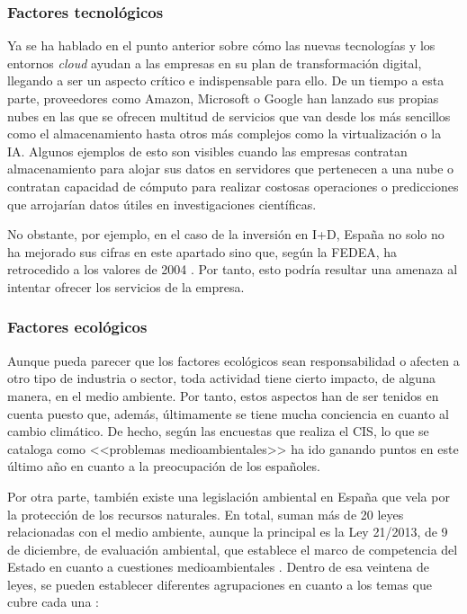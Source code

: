 \subsubsection{Factores tecnológicos}
Ya se ha hablado en el punto anterior sobre cómo las nuevas tecnologías y los entornos \textit{cloud} ayudan a las empresas en su plan de transformación digital, llegando a ser un aspecto crítico e indispensable para ello. De un tiempo a esta parte, proveedores como Amazon, Microsoft o Google han lanzado sus propias nubes en las que se ofrecen multitud de servicios que van desde los más sencillos como el almacenamiento hasta otros más complejos como la virtualización o la \acf{IA}. Algunos ejemplos de esto son visibles cuando las empresas contratan almacenamiento para alojar sus datos en servidores que pertenecen a una nube o contratan capacidad de cómputo para realizar costosas operaciones o predicciones que arrojarían datos útiles en investigaciones científicas.

No obstante, por ejemplo, en el caso de la inversión en I+D, España no solo no ha mejorado sus cifras en este apartado sino que, según la \acf{FEDEA}, ha retrocedido a los valores de 2004 \cite{robertolopezvargas2019}. Por tanto, esto podría resultar una amenaza al intentar ofrecer los servicios de la empresa.

\subsubsection{Factores ecológicos}
Aunque pueda parecer que los factores ecológicos sean responsabilidad o afecten a otro tipo de industria o sector, toda actividad tiene cierto impacto, de alguna manera, en el medio ambiente. Por tanto, estos aspectos han de ser tenidos en cuenta puesto que, además, últimamente se tiene mucha conciencia en cuanto al cambio climático. De hecho, según las encuestas que realiza el \acf{CIS}, lo que se cataloga como <<problemas medioambientales>> ha ido ganando puntos en este último año en cuanto a la preocupación de los españoles.

Por otra parte, también existe una legislación ambiental en España que vela por la protección de los recursos naturales. En total, suman más de 20 leyes relacionadas con el medio ambiente, aunque la principal es la Ley 21/2013, de 9 de diciembre, de evaluación ambiental, que establece el marco de competencia del Estado en cuanto a cuestiones medioambientales \cite{boemedioamb}. Dentro de esa veintena de leyes, se pueden establecer diferentes agrupaciones en cuanto a los temas que cubre cada una \cite{ceremcomunicacion2018}: 

